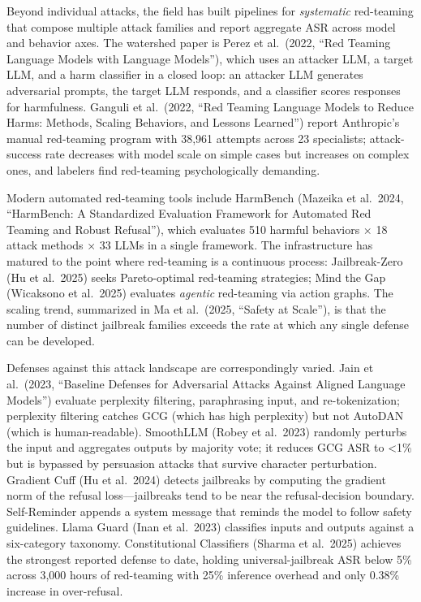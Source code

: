 \documentclass{article}
\begin{document}
Beyond individual attacks, the field has built pipelines for \emph{systematic} red-teaming that compose multiple attack families and report aggregate ASR across model and behavior axes. The watershed paper is Perez et al.~(2022, ``Red Teaming Language Models with Language Models''), which uses an attacker LLM, a target LLM, and a harm classifier in a closed loop: an attacker LLM generates adversarial prompts, the target LLM responds, and a classifier scores responses for harmfulness. Ganguli et al.~(2022, ``Red Teaming Language Models to Reduce Harms: Methods, Scaling Behaviors, and Lessons Learned'') report Anthropic's manual red-teaming program with 38,961 attempts across 23 specialists; attack-success rate decreases with model scale on simple cases but increases on complex ones, and labelers find red-teaming psychologically demanding.

Modern automated red-teaming tools include HarmBench (Mazeika et al.~2024, ``HarmBench: A Standardized Evaluation Framework for Automated Red Teaming and Robust Refusal''), which evaluates 510 harmful behaviors × 18 attack methods × 33 LLMs in a single framework. The infrastructure has matured to the point where red-teaming is a continuous process: Jailbreak-Zero (Hu et al.~2025) seeks Pareto-optimal red-teaming strategies; Mind the Gap (Wicaksono et al.~2025) evaluates \emph{agentic} red-teaming via action graphs. The scaling trend, summarized in Ma et al.~(2025, ``Safety at Scale''), is that the number of distinct jailbreak families exceeds the rate at which any single defense can be developed.

Defenses against this attack landscape are correspondingly varied. Jain et al.~(2023, ``Baseline Defenses for Adversarial Attacks Against Aligned Language Models'') evaluate perplexity filtering, paraphrasing input, and re-tokenization; perplexity filtering catches GCG (which has high perplexity) but not AutoDAN (which is human-readable). SmoothLLM (Robey et al.~2023) randomly perturbs the input and aggregates outputs by majority vote; it reduces GCG ASR to \textless1\% but is bypassed by persuasion attacks that survive character perturbation. Gradient Cuff (Hu et al.~2024) detects jailbreaks by computing the gradient norm of the refusal loss---jailbreaks tend to be near the refusal-decision boundary. Self-Reminder appends a system message that reminds the model to follow safety guidelines. Llama Guard (Inan et al.~2023) classifies inputs and outputs against a six-category taxonomy. Constitutional Classifiers (Sharma et al.~2025) achieves the strongest reported defense to date, holding universal-jailbreak ASR below 5\% across 3,000 hours of red-teaming with 25\% inference overhead and only 0.38\% increase in over-refusal.
\end{document}
